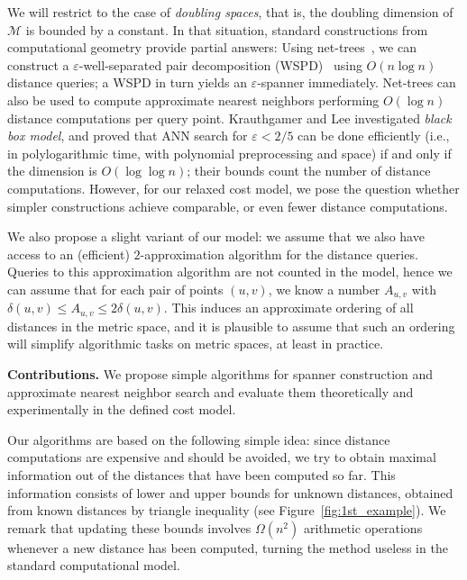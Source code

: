 \documentclass[a4paper,UKenglish,cleveref, autoref]{lipics-v2019}
\newcommand{\eps}{\varepsilon}
\newcommand{\metricspace}{\mathcal{M}}
\newcommand{\dist}{\delta}
\newcommand{\myparagraph}[1]{\textbf{#1.}}
\begin{document}
We will restrict to the case of \emph{doubling spaces}, that is, the doubling dimension
of $\metricspace$ is bounded by a constant. 
In that situation, standard constructions from computational geometry provide partial answers:
Using net-trees~\cite{hm-fast}, we can construct a $\eps$-well-separated pair decomposition (WSPD)~\cite{CK-decomposition} using $O(n\log n)$ distance queries; a WSPD in turn yields
an $\eps$-spanner immediately. Net-trees can also be used to compute approximate nearest neighbors
performing $O(\log n)$ distance computations per query point.
Krauthgamer and Lee \cite{krauthgamer2005black} investigated \textit{black box model},
and proved that ANN search for $\eps < 2/5$ can be done efficiently (i.e., in polylogarithmic time, with polynomial preprocessing
and space) if and only if the dimension is $O(\log \log n)$; their bounds count the number of distance computations.
However, for our relaxed cost model, we pose the question whether simpler constructions achieve
comparable, or even fewer distance computations.

We also propose a slight variant of our model: we assume that we also have access to an (efficient)
$2$-approximation algorithm for the distance queries. Queries to this approximation algorithm
are not counted in the model, hence we can assume that for each pair of points $(u,v)$, we
know a number $A_{u,v}$ with $\dist(u,v)\leq A_{u,v}\leq 2\dist(u,v)$. This induces an approximate ordering
of all distances in the metric space, and it is plausible to assume that such an ordering will simplify
algorithmic tasks on metric spaces, at least in practice.

\myparagraph{Contributions}
%
We propose simple algorithms for spanner construction and approximate nearest neighbor search
and evaluate them theoretically and experimentally in the defined cost model.

Our algorithms are based on the following simple idea: since distance computations are expensive
and should be avoided, we try to obtain maximal information out of the distances that have been computed
so far. 
This information consists of lower and upper bounds for unknown distances, obtained from known distances
by triangle inequality (see Figure~\ref{fig:1st_example}). We remark that updating these bounds involves $\Omega(n^2)$ arithmetic
operations whenever a new distance has been computed, turning the method useless in the standard computational model.
\end{document}
